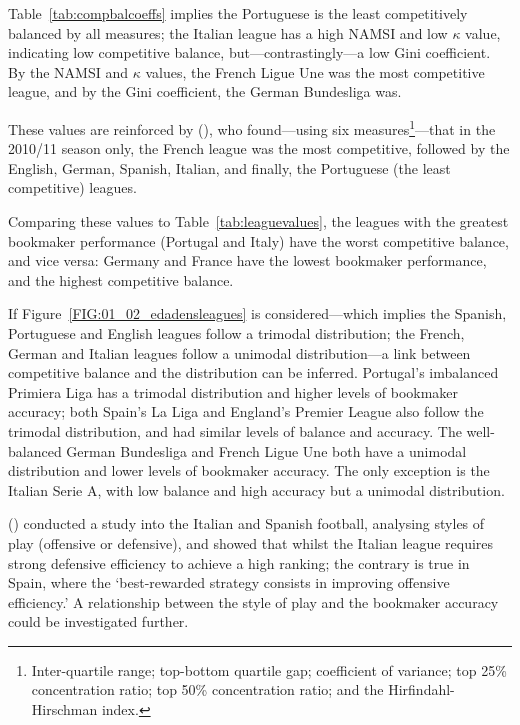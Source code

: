\documentclass[a4paper,10pt]{report}
\begin{document}
Table~\ref{tab:compbalcoeffs} implies the Portuguese is the least competitively balanced by all measures; the Italian league has a high NAMSI and low $\kappa$ value, indicating low competitive balance, but---contrastingly---a low Gini coefficient. By the NAMSI and $\kappa$ values, the French Ligue Une was the most competitive league, and by the Gini coefficient, the German Bundesliga was. 

These values are reinforced by \citeauthor{ramchandani12} (\citeyear{ramchandani12}), who found---using six measures\footnote{Inter-quartile range; top-bottom quartile gap; coefficient of variance; top 25\% concentration ratio; top 50\% concentration ratio; and the Hirfindahl-Hirschman index.}---that in the 2010/11 season only, the French league was the most competitive, followed by the English, German, Spanish, Italian, and finally, the Portuguese (the least competitive) leagues. \vspace{3mm}

Comparing these values to Table~\ref{tab:leaguevalues}, the leagues with the greatest bookmaker performance (Portugal and Italy) have the worst competitive balance, and vice versa: Germany and France have the lowest bookmaker performance, and the highest competitive balance.

If Figure~\ref{FIG:01_02_edadensleagues} is considered---which implies the Spanish, Portuguese and English leagues follow a trimodal distribution; the French, German and Italian leagues follow a unimodal distribution---a link between competitive balance and the distribution can be inferred. Portugal's imbalanced Primiera Liga has a trimodal distribution and higher levels of bookmaker accuracy; both Spain's La Liga and England's Premier League also follow the trimodal distribution, and had similar levels of balance and accuracy. The well-balanced German Bundesliga and French Ligue Une both have a unimodal distribution and lower levels of bookmaker accuracy. The only exception is the Italian Serie A, with low balance and high accuracy but a unimodal distribution.\vspace{3mm}

\citeauthor{bosca09} (\citeyear{bosca09}) conducted a study into the Italian and Spanish football, analysing styles of play (offensive or defensive), and showed that whilst the Italian league requires strong defensive efficiency to achieve a high ranking; the contrary is true in Spain, where the `best-rewarded strategy consists in improving offensive efficiency.' A relationship between the style of play and the bookmaker accuracy could be investigated further.
\end{document}
